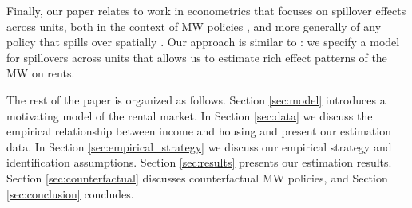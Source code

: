 Finally, our paper relates to work in econometrics that focuses on spillover 
effects across units,
both in the context of MW policies 
\parencite{Kuehn2016, JardimEtAl2022discontinuity}, 
and more generally of any policy that spills over spatially
\parencite{DelgadoFlorax2015, Butts2021}.
Our approach is similar to \textcite{GiroudMueller2019}: we specify a model for 
spillovers across units that allows us to estimate rich effect patterns of the 
MW on rents.

The rest of the paper is organized as follows.
Section \ref{sec:model} introduces a motivating model of the rental market.
In Section \ref{sec:data} we discuss the empirical relationship between income 
and housing and present our estimation data.
In Section \ref{sec:empirical_strategy} we discuss our empirical strategy and
identification assumptions.
Section \ref{sec:results} presents our estimation results.
Section \ref{sec:counterfactual} discusses counterfactual MW policies, and
Section \ref{sec:conclusion} concludes.
